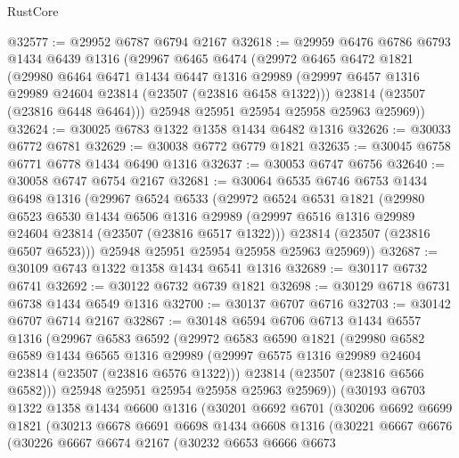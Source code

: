 \begin{lexlean}{RustCore}
\begin{coremodule}
@32577 := @29952 @6787 @6794 @2167
@32618 := @29959
    @6476
    @6786
    @6793
    @1434
    @6439
    @1316
    (@29967
      @6465
      @6474
      (@29972
        @6465
        @6472
        @1821
        (@29980
          @6464
          @6471
          @1434
          @6447
          @1316
          @29989
          (@29997 @6457 @1316 @29989 @24604 @23814 (@23507 (@23816 @6458 @1322)))
          @23814
          (@23507 (@23816 @6448 @6464)))
        @25948
        @25951
        @25954
        @25958
        @25963
        @25969))
@32624 := @30025 @6783 @1322 @1358 @1434 @6482 @1316
@32626 := @30033 @6772 @6781
@32629 := @30038 @6772 @6779 @1821
@32635 := @30045 @6758 @6771 @6778 @1434 @6490 @1316
@32637 := @30053 @6747 @6756
@32640 := @30058 @6747 @6754 @2167
@32681 := @30064
    @6535
    @6746
    @6753
    @1434
    @6498
    @1316
    (@29967
      @6524
      @6533
      (@29972
        @6524
        @6531
        @1821
        (@29980
          @6523
          @6530
          @1434
          @6506
          @1316
          @29989
          (@29997 @6516 @1316 @29989 @24604 @23814 (@23507 (@23816 @6517 @1322)))
          @23814
          (@23507 (@23816 @6507 @6523)))
        @25948
        @25951
        @25954
        @25958
        @25963
        @25969))
@32687 := @30109 @6743 @1322 @1358 @1434 @6541 @1316
@32689 := @30117 @6732 @6741
@32692 := @30122 @6732 @6739 @1821
@32698 := @30129 @6718 @6731 @6738 @1434 @6549 @1316
@32700 := @30137 @6707 @6716
@32703 := @30142 @6707 @6714 @2167
@32867 := @30148
    @6594
    @6706
    @6713
    @1434
    @6557
    @1316
    (@29967
      @6583
      @6592
      (@29972
        @6583
        @6590
        @1821
        (@29980
          @6582
          @6589
          @1434
          @6565
          @1316
          @29989
          (@29997 @6575 @1316 @29989 @24604 @23814 (@23507 (@23816 @6576 @1322)))
          @23814
          (@23507 (@23816 @6566 @6582)))
        @25948
        @25951
        @25954
        @25958
        @25963
        @25969))
    (@30193
      @6703
      @1322
      @1358
      @1434
      @6600
      @1316
      (@30201
        @6692
        @6701
        (@30206
          @6692
          @6699
          @1821
          (@30213
            @6678
            @6691
            @6698
            @1434
            @6608
            @1316
            (@30221
              @6667
              @6676
              (@30226
                @6667
                @6674
                @2167
                (@30232
                  @6653
                  @6666
                  @6673

\end{coremodule}
\end{lexlean}

